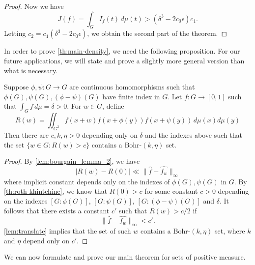\begin{proof}
    Now we have
    \begin{equation*}
        J(f) = \int_G I_f(t) \, d\mu(t) > (\delta^3 - 2 c_0 \epsilon) c_1.
    \end{equation*}
    Letting $c_2 = c_1(\delta^3 - 2c_0 \epsilon)$, we obtain the second part of the theorem. 
\end{proof}


In order to prove \cref{th:main-density}, we need the following proposition. For our future applications, we will state and prove a slightly more general version than what is necessary.


\begin{proposition}
\label{prop:density-bohr-stronger}
Suppose $\phi, \psi: G \rightarrow G$ are continuous homomorphisms such that $\phi(G), \psi(G), (\phi-\psi)(G)$ have finite index in $G$. Let $f : G \rightarrow [0,1]$ such that $\int_G f \, d\mu = \delta >0$. For $w \in G$, define
\[
    R(w) = \iint_{G^2} f(x + w) f(x + \phi(y)) f(x+\psi(y))  \, d\mu(x) d\mu(y)
\]
Then there are $c, k, \eta >0$ depending only on $\delta$ and the indexes above such that the set
 $\{ w \in G: R(w) > c\}$ contains a Bohr-$(k,\eta)$ set. 
\end{proposition}


\begin{proof}
By \cref{lem:bourgain_lemma_2}, we have
\[
    |R(w) - R(0)| \ll \lVert \hat{f} - \widehat{f_w} \rVert_{\infty}
\]
where implicit constant depends only on the indexes of $\phi(G), \psi(G)$ in $G$. 
By \cref{th:roth-khintchine}, we know that $R(0) > c$ for some constant $c>0$ depending on the indexes $[G: \phi(G)]$, $[G: \psi(G)]$, $[G: (\phi - \psi)(G)]$ and $\delta$. It follows that there exists a constant $c'$ such that $R(w) > c/2$ if 
\begin{equation}
    \lVert \hat{f} - \widehat{f_w} \rVert_{\infty} < c'.
\end{equation}
\cref{lem:translate} implies that the set of such $w$ contains a Bohr-$(k,\eta)$ set, where $k$ and $\eta$ depend only on $c'$.
\end{proof}

We can now formulate and prove our main theorem for sets of positive measure.

